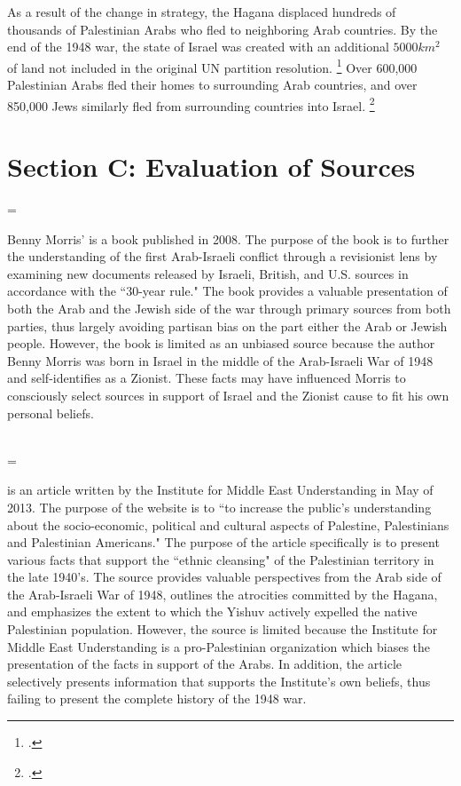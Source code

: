 \documentclass[11pt]{turabian-researchpaper}
\begin{document}
As a result of the change in strategy, the Hagana displaced hundreds of thousands of Palestinian Arabs who fled to neighboring Arab countries.  By the end of the 1948 war, the state of Israel was created with an additional $5000km^2$ of land not included in the original UN partition resolution.
\footcite{lorch}
Over 600,000 Palestinian Arabs fled their homes to surrounding Arab countries, and over 850,000 Jews similarly fled from surrounding countries into Israel.
\footcite{bartal}

\section{Section C: Evaluation of Sources}


\hangindent=\parindent \noindent {}

Benny Morris'  is a book published in 2008.  The purpose of the book is to further the understanding of the first Arab-Israeli conflict through a revisionist lens by examining new documents released by Israeli, British, and U.S. sources in accordance with the ``30-year rule."  The book provides a valuable presentation of both the Arab and the Jewish side of the war through primary sources from both parties, thus largely avoiding partisan bias on the part either the Arab or Jewish people.  However, the book is limited as an unbiased source because the author Benny Morris was born in Israel in the middle of the Arab-Israeli War of 1948 and self-identifies as a Zionist.  These facts may have influenced Morris to consciously select sources in support of Israel and the Zionist cause to fit his own personal beliefs.



~\\



\hangindent=\parindent \noindent {}

 is an article written by the Institute for Middle East Understanding in May of 2013.  The purpose of the website is to ``to increase the public's understanding about the socio-economic, political and cultural aspects of Palestine, Palestinians and Palestinian Americans."  The purpose of the article specifically is to present various facts that support the ``ethnic cleansing" of the Palestinian territory in the late 1940's.  The source provides valuable perspectives from the Arab side of the Arab-Israeli War of 1948, outlines the atrocities committed by the Hagana, and emphasizes the extent to which the Yishuv actively expelled the native Palestinian population.  However, the source is limited because the Institute for Middle East Understanding is a pro-Palestinian organization which biases the presentation of the facts in support of the Arabs.  In addition, the article selectively presents information that supports the Institute's own beliefs, thus failing to present the complete history of the 1948 war.
\end{document}
